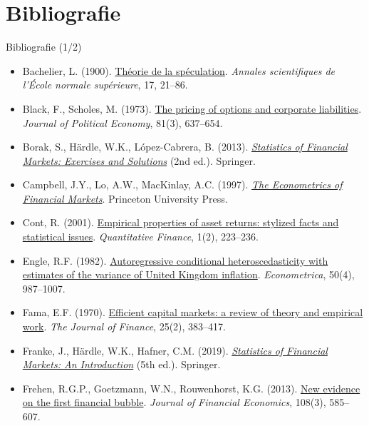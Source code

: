 \section{Bibliografie}

\begin{frame}{Bibliografie (1/2)}
\itemsize{\tiny}
\begin{itemize}
    \item Bachelier, L. (1900). \href{https://doi.org/10.24033/asens.476}{Théorie de la spéculation}. \emph{Annales scientifiques de l'École normale supérieure}, 17, 21--86.
    \item Black, F., Scholes, M. (1973). \href{https://doi.org/10.1086/260062}{The pricing of options and corporate liabilities}. \emph{Journal of Political Economy}, 81(3), 637--654.
    \item Borak, S., Härdle, W.K., López-Cabrera, B. (2013). \href{https://doi.org/10.1007/978-3-642-33929-5}{\emph{Statistics of Financial Markets: Exercises and Solutions}} (2nd ed.). Springer.
    \item Campbell, J.Y., Lo, A.W., MacKinlay, A.C. (1997). \href{https://doi.org/10.1515/9781400830213}{\emph{The Econometrics of Financial Markets}}. Princeton University Press.
    \item Cont, R. (2001). \href{https://doi.org/10.1080/713665670}{Empirical properties of asset returns: stylized facts and statistical issues}. \emph{Quantitative Finance}, 1(2), 223--236.
    \item Engle, R.F. (1982). \href{https://doi.org/10.2307/1912773}{Autoregressive conditional heteroscedasticity with estimates of the variance of United Kingdom inflation}. \emph{Econometrica}, 50(4), 987--1007.
    \item Fama, E.F. (1970). \href{https://doi.org/10.2307/2325486}{Efficient capital markets: a review of theory and empirical work}. \emph{The Journal of Finance}, 25(2), 383--417.
    \item Franke, J., Härdle, W.K., Hafner, C.M. (2019). \href{https://doi.org/10.1007/978-3-030-13751-9}{\emph{Statistics of Financial Markets: An Introduction}} (5th ed.). Springer.
    \item Frehen, R.G.P., Goetzmann, W.N., Rouwenhorst, K.G. (2013). \href{https://doi.org/10.1016/j.jfineco.2012.12.008}{New evidence on the first financial bubble}. \emph{Journal of Financial Economics}, 108(3), 585--607.

\end{itemize}
\end{frame}
